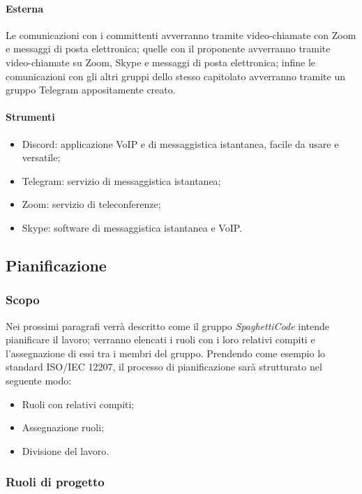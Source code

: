\paragraph{Esterna}

Le comunicazioni con i committenti avverranno tramite video-chiamate con Zoom e messaggi di posta elettronica; 
quelle con il proponente avverranno tramite video-chiamate su Zoom, Skype e messaggi di posta elettronica; infine 
le comunicazioni con gli altri gruppi dello stesso capitolato avverranno tramite un gruppo Telegram appositamente 
creato.

\paragraph{Strumenti}

\begin{itemize}
    \item Discord: applicazione VoIP e di messaggistica istantanea, facile da usare e versatile;
    \item Telegram: servizio di messaggistica istantanea;
    \item Zoom: servizio di teleconferenze;
    \item Skype: software di messaggistica istantanea e VoIP.
\end{itemize}

\subsection{Pianificazione}
\label{sub:pianificazione}

\subsubsection{Scopo}

Nei prossimi paragrafi verrà descritto come il gruppo \emph{SpaghettiCode} intende pianificare il lavoro; verranno 
elencati i ruoli con i loro relativi compiti e l'assegnazione di essi tra i membri del gruppo. Prendendo come esempio 
lo standard ISO/IEC 12207, il processo di pianificazione sarà strutturato nel seguente modo:
\begin{itemize}
    \item Ruoli con relativi compiti;
    \item Assegnazione ruoli;
    \item Divisione del lavoro.
\end{itemize}

\subsubsection{Ruoli di progetto}

